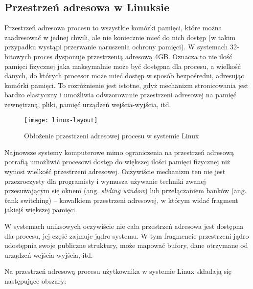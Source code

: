 \documentclass[12pt,a4paper,titlepage,twoside]{mwart}
\begin{document}
\subsection{Przestrzeń adresowa w Linuksie}

Przestrzeń adresowa procesu to wszystkie komórki pamięci, które można
zaadresować w jednej chwili, ale nie koniecznie mieć do nich dostęp (w takim
przypadku wystąpi przerwanie naruszenia ochrony pamięci). W systemach
32-bitowych proces dysponuje przestrzenią adresową 4GB. Oznacza to nie ilość
pamięci fizycznej jaka maksymalnie może być dostępna dla procesu, a wielkość
danych, do których procesor może mieć dostęp w sposób bezpośredni, adresując
komórki pamięci. To rozróżnienie jest istotne, gdyż mechanizm stronicowania
jest bardzo elastyczny i umożliwia odwzorowanie przestrzeni adresowej na pamięć
zewnętrzną, pliki, pamięć urządzeń wejścia-wyjścia, itd.

\begin{figure}[h]
\centering
\texttt{[image: linux-layout]}
\caption{Obłożenie przestrzeni adresowej procesu w systemie Linux}
\end{figure}

Najnowsze systemy komputerowe mimo ograniczenia na przestrzeń adresową potrafią
umożliwić procesowi dostęp do większej ilości pamięci fizycznej niż wynosi
wielkość przestrzeni adresowej. Oczywiście mechanizm ten nie jest przezroczysty
dla programisty i wymusza używanie techniki zwanej przesuwającym się oknem
(ang. \textit{sliding window}) lub przełączaniem banków (ang. \textit bank
switching) -- kawałkiem przestrzeni adresowej, w którym widać fragment jakiejś
większej pamięci.

W systemach uniksowych oczywiście nie cała przestrzeń adresowa jest dostępna
dla procesu, jej część zajmuje jądro systemu. W tym fragmencie przestrzeni
jądro udostępnia swoje publiczne struktury, może mapować bufory, dane otrzymane
od urządzeń wejścia-wyjścia, itd.

Na przestrzeń adresową procesu użytkownika w systemie Linux składają się
następujące obszary:
\end{document}
